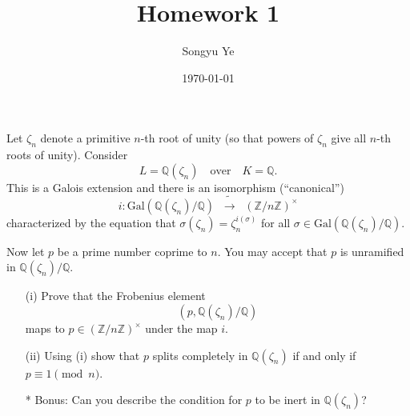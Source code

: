 \documentclass[12pt]{article}  %
\title{Homework 1}
\author{Songyu Ye}
\date{\today}
\begin{document}
\psettitle

\begin{problem}[Problem 1]
Let $\zeta_n$ denote a primitive $n$-th root of unity (so that powers of $\zeta_n$ give all $n$-th roots of unity). Consider 
\[
L = \mathbb{Q}(\zeta_n) \quad \text{over} \quad K = \mathbb{Q}.
\]
This is a Galois extension and there is an isomorphism (``canonical'')
\[
i : \mathrm{Gal}(\mathbb{Q}(\zeta_n)/\mathbb{Q}) \;\;\widetilde{\longrightarrow}\;\; (\mathbb{Z}/n\mathbb{Z})^{\times}
\]
characterized by the equation that $\sigma(\zeta_n) = \zeta_n^{i(\sigma)}$ for all $\sigma \in \mathrm{Gal}(\mathbb{Q}(\zeta_n)/\mathbb{Q})$. 

Now let $p$ be a prime number coprime to $n$. You may accept that $p$ is unramified in $\mathbb{Q}(\zeta_n)/\mathbb{Q}$.

\begin{enumerate}
    \item[(i)] Prove that the Frobenius element 
    \[
    (p, \mathbb{Q}(\zeta_n)/\mathbb{Q})
    \]
    maps to $p \in (\mathbb{Z}/n\mathbb{Z})^{\times}$ under the map $i$.
    
    \item[(ii)] Using (i) show that $p$ splits completely in $\mathbb{Q}(\zeta_n)$ if and only if $p \equiv 1 \pmod{n}$.
    
    \item[*] Bonus: Can you describe the condition for $p$ to be inert in $\mathbb{Q}(\zeta_n)$?
\end{enumerate}
\end{problem}
\end{document}
